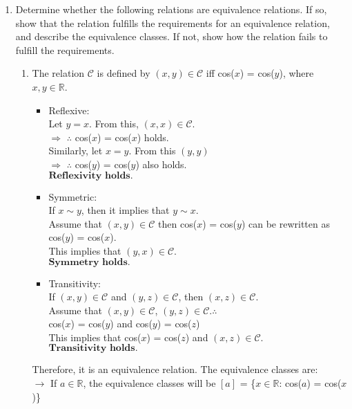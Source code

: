 \documentclass{article}
\newcommand{\R}{\mathbb{R}}
\begin{document}
\begin{enumerate}
\item Determine whether the following relations are equivalence relations. 
If so, show that the relation fulfills the requirements for an equivalence relation, 
and describe the equivalence classes. If not, show how the relation fails to fulfill 
the requirements.
\begin{enumerate}
    \item The relation $\mathcal{C}$ is defined by $(x,y)\in \mathcal{C}$ iff cos($x$) = cos($y$), 
    where $x,y \in \R$.
    \begin{itemize}
        \item Reflexive:\\ Let $y = x$. From this, $(x,x) \in \mathcal{C}$.\\ 
        $\Rightarrow$ $\therefore$ cos($x$) = cos($x$) holds.\\
        Similarly, let $x = y$. From this $(y,y)$\\ 
        $\Rightarrow$ $\therefore$ cos($y$) = cos($y$) also holds.\\$\textbf{Reflexivity holds.}$\\

        \item Symmetric:\\If $x \sim y$, then it implies that $y \sim x$.\\Assume that $(x,y) \in 
        \mathcal{C}$ then cos($x$) = cos($y$) can be rewritten as cos($y$) = cos($x$).\\This implies 
        that $(y,x) \in \mathcal{C}$.\\$\textbf{Symmetry holds.}$\\ 

        \item Transitivity:\\If $(x,y) \in \mathcal{C}$ and $(y,z) \in \mathcal{C}$, then $(x,z) \in \mathcal{C}$.\\
        Assume that $(x,y) \in \mathcal{C}$, $(y,z) \in \mathcal{C}$.$\therefore$\\
        cos($x$) = cos($y$) and cos($y$) = cos($z$)\\
        This implies that cos($x$) = cos($z$) and $(x,z) \in \mathcal{C}$.\\$\textbf{Transitivity holds.}$\\
    \end{itemize}
    Therefore, it is an equivalence relation. The equivalence classes are:\\
    $\rightarrow$ If $a \in \R$, the equivalence classes will be $[a]$ = \{$x \in \R$: cos($a$) = cos($x$)\}\\


\end{enumerate}
\end{enumerate}
\end{document}

